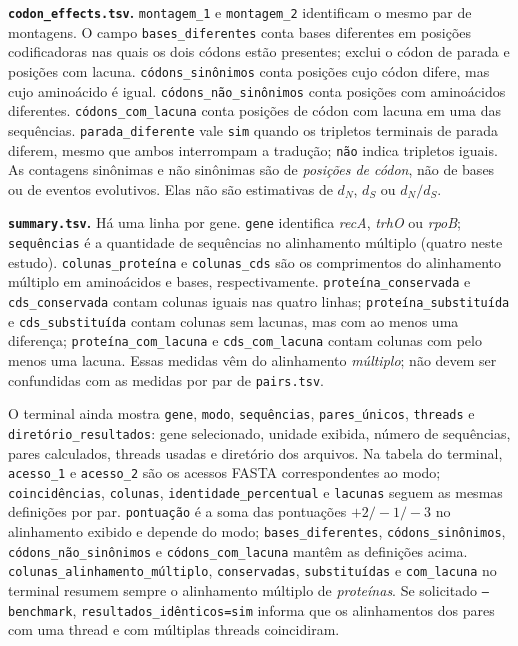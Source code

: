 \documentclass[12pt]{article}
\begin{document}
\noindent\textbf{\texttt{codon\_effects.tsv}.} \texttt{montagem\_1} e
\texttt{montagem\_2} identificam o mesmo par de montagens. O campo
\texttt{bases\_diferentes} conta bases diferentes em posições codificadoras
nas quais os dois códons estão presentes; exclui o códon de parada e posições
com lacuna. \texttt{códons\_sinônimos} conta posições cujo códon difere,
mas cujo aminoácido é igual. \texttt{códons\_não\_sinônimos} conta posições
com aminoácidos diferentes. \texttt{códons\_com\_lacuna} conta posições de códon
com lacuna em uma das sequências. \texttt{parada\_diferente} vale
\texttt{sim} quando os tripletos terminais de parada diferem, mesmo que
ambos interrompam a tradução; \texttt{não} indica tripletos iguais. As
contagens sinônimas e não sinônimas são de \emph{posições de códon}, não de
bases ou de eventos evolutivos. Elas não são estimativas de $d_N$, $d_S$ ou
$d_N/d_S$.

\noindent\textbf{\texttt{summary.tsv}.} Há uma linha por gene.
\texttt{gene} identifica \textit{recA}, \textit{trhO} ou \textit{rpoB};
\texttt{sequências} é a quantidade de sequências no alinhamento múltiplo
(quatro neste estudo). \texttt{colunas\_proteína} e \texttt{colunas\_cds}
são os comprimentos do alinhamento múltiplo em aminoácidos e bases,
respectivamente. \texttt{proteína\_conservada} e \texttt{cds\_conservada}
contam colunas iguais nas quatro linhas; \texttt{proteína\_substituída} e
\texttt{cds\_substituída} contam colunas sem lacunas, mas com ao menos uma
diferença; \texttt{proteína\_com\_lacuna} e \texttt{cds\_com\_lacuna} contam
colunas com pelo menos uma lacuna. Essas medidas vêm do alinhamento
\emph{múltiplo}; não devem ser confundidas com as medidas por par de
\texttt{pairs.tsv}.

O terminal ainda mostra \texttt{gene}, \texttt{modo}, \texttt{sequências},
\texttt{pares\_únicos}, \texttt{threads} e \texttt{diretório\_resultados}: gene
selecionado, unidade exibida, número de sequências, pares calculados, threads
usadas e diretório dos arquivos. Na tabela do terminal, \texttt{acesso\_1}
e \texttt{acesso\_2} são os acessos FASTA correspondentes ao modo;
\texttt{coincidências}, \texttt{colunas}, \texttt{identidade\_percentual} e
\texttt{lacunas} seguem as mesmas definições por par. \texttt{pontuação} é a soma
das pontuações $+2/-1/-3$ no alinhamento exibido e depende do modo;
\texttt{bases\_diferentes}, \texttt{códons\_sinônimos},
\texttt{códons\_não\_sinônimos} e \texttt{códons\_com\_lacuna} mantêm as definições
acima. \texttt{colunas\_alinhamento\_múltiplo}, \texttt{conservadas},
\texttt{substituídas} e \texttt{com\_lacuna} no terminal resumem sempre o
alinhamento múltiplo de \emph{proteínas}. Se solicitado \texttt{--benchmark},
\texttt{resultados\_idênticos=sim} informa que os alinhamentos dos pares com
uma thread e com múltiplas threads coincidiram.
\end{document}
